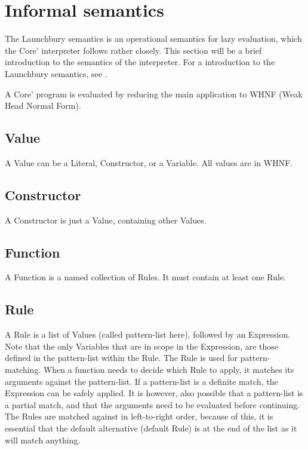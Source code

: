 \section{Informal semantics}

The Launchbury semantics is an operational semantics for 
lazy evaluation, which the Core' interpreter follows rather closely. 
This section will be a brief introduction to the semantics of the interpreter.
For a introduction to 
the Launchbury semantics, see \cite{launchbury1993natural}. 

A Core' program is evaluated by reducing the main application to WHNF 
(Weak Head Normal Form).

\subsection*{Value}
A Value can be a Literal, Constructor, or a Variable. All values are in WHNF.

\subsection*{Constructor}
A Constructor is just a Value, containing other Values.

\subsection*{Function}
A Function is a named collection of Rules. It must contain at least one Rule.

\subsection*{Rule}
A Rule is a list of Values (called pattern-list here), followed by an Expression. 
Note that the only Variables
that are in scope in the Expression, are those defined in the pattern-list within 
the Rule. The Rule is used for pattern-matching. When a function needs to decide
which Rule to apply, it matches its arguments against the pattern-list. 
If a pattern-list is a definite match, the Expression can be safely
applied. It is however, also possible that a pattern-list is a partial match, and
that the arguments need to be evaluated before continuing. The Rules are matched
against in left-to-right order, because of this, it is essential that the 
default alternative (default Rule) is at the end of the list as it will match
anything.

